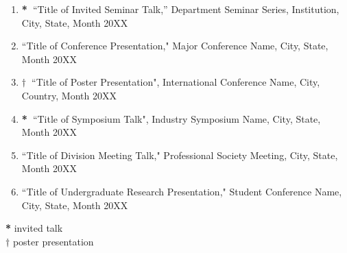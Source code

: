 \begin{enumerate}
\item \textbf{*~}``Title of Invited Seminar Talk,'' Department Seminar Series, Institution, City, State, Month 20XX

\item ``Title of Conference Presentation," Major Conference Name, City, State, Month 20XX 

\item \textbf{$\dagger$~}``Title of Poster Presentation", International Conference Name, City, Country, Month 20XX

\item \textbf{*~}``Title of Symposium Talk", Industry Symposium Name, City, State, Month 20XX

\item ``Title of Division Meeting Talk," Professional Society Meeting, City, State, Month 20XX

\item ``Title of Undergraduate Research Presentation," Student Conference Name, City, State, Month 20XX
\end{enumerate}
\begin{adjustwidth}{2em}{}
\textbf{*} invited talk \\
\textbf{$\dagger$} poster presentation
\end{adjustwidth}